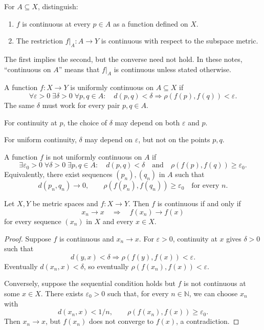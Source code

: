 \documentclass[answers,12pt,addpoints]{exam}
\begin{document}
\begin{remark}
For $A\subseteq X$, distinguish:
\begin{enumerate}
    \item $f$ is continuous at every $p\in A$ as a function
    defined on $X$.
    \item The restriction $f|_A:A\to Y$ is continuous
    with respect to the subspace metric.
\end{enumerate}
The first implies the second, but the converse need not
hold. In these notes, ``continuous on $A$'' means that
$f|_A$ is continuous unless stated otherwise.
\end{remark}

\begin{definition}
A function $f:X\to Y$ is uniformly continuous on
$A\subseteq X$ if
\[
\forall\varepsilon>0\;
\exists\delta>0\;
\forall p,q\in A:
\quad
d(p,q)<\delta
\Longrightarrow
\rho(f(p),f(q))<\varepsilon.
\]
The same $\delta$ must work for every pair $p,q\in A$.
\end{definition}

\begin{remark}
For continuity at $p$, the choice of $\delta$ may depend
on both $\varepsilon$ and $p$.

For uniform continuity, $\delta$ may depend on
$\varepsilon$, but not on the points $p,q$.
\end{remark}

\begin{remark}
A function $f$ is not uniformly continuous on $A$ if
\[
\exists\varepsilon_0>0\;
\forall\delta>0\;
\exists p,q\in A:
\quad
d(p,q)<\delta
\quad\text{and}\quad
\rho(f(p),f(q))\geq\varepsilon_0.
\]
Equivalently, there exist sequences $(p_n),(q_n)$ in $A$
such that
\[
d(p_n,q_n)\to 0,
\qquad
\rho(f(p_n),f(q_n))\geq\varepsilon_0
\quad\text{for every }n.
\]
\end{remark}

\begin{theorem}
Let $X,Y$ be metric spaces and $f:X\to Y$.
Then $f$ is continuous if and only if
\[
x_n\to x
\quad\Longrightarrow\quad
f(x_n)\to f(x)
\]
for every sequence $(x_n)$ in $X$ and every $x\in X$.
\end{theorem}

\begin{proof}
Suppose $f$ is continuous and $x_n\to x$.
For $\varepsilon>0$, continuity at $x$ gives $\delta>0$
such that
\[
d(y,x)<\delta
\Longrightarrow
\rho(f(y),f(x))<\varepsilon.
\]
Eventually $d(x_n,x)<\delta$, so eventually
$\rho(f(x_n),f(x))<\varepsilon$.

Conversely, suppose the sequential condition holds but
$f$ is not continuous at some $x\in X$.
There exists $\varepsilon_0>0$ such that, for every
$n\in\mathbb{N}$, we can choose $x_n$ with
\[
d(x_n,x)<1/n,
\qquad
\rho(f(x_n),f(x))\geq\varepsilon_0.
\]
Then $x_n\to x$, but $f(x_n)$ does not converge to $f(x)$,
a contradiction.
\end{proof}
\end{document}
